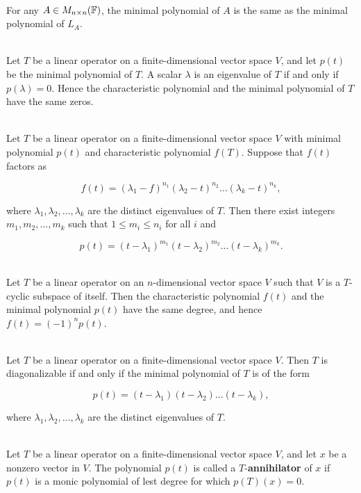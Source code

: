 \begin{corollary}
	\hfill\\
	For any $A \in M_{n \times n}(\mathbb{F})$, the minimal polynomial of $A$ is the same as the minimal polynomial of $L_A$.
\end{corollary}

\begin{theorem}
	\hfill\\
	Let $T$ be a linear operator on a finite-dimensional vector space $V$, and let $p(t)$ be the minimal polynomial of $T$. A scalar $\lambda$ is an eigenvalue of $T$ if and only if $p(\lambda) = 0$. Hence the characteristic polynomial and the minimal polynomial of $T$ have the same zeros.
\end{theorem}

\begin{corollary}
	\hfill\\
	Let $T$ be a linear operator on a finite-dimensional vector space $V$ with minimal polynomial $p(t)$ and characteristic polynomial $f(T)$. Suppose that $f(t)$ factors as

	\[f(t) = (\lambda_1 - f)^{n_1}(\lambda_2 - t)^{n_2} \dots(\lambda_k - t)^{n_k},\]

	where $\lambda_1, \lambda_2, \dots, \lambda_k$ are the distinct eigenvalues of $T$. Then there exist integers $m_1, m_2, \dots, m_k$ such that $1 \leq m_i \leq n_i$ for all $i$ and

	\[p(t) = (t - \lambda_1)^{m_1}(t - \lambda_2)^{m_2}\dots(t - \lambda_k)^{m_k}.\]
\end{corollary}

\begin{theorem}\label{Theorem 7.15}
	\hfill\\
	Let $T$ be a linear operator on an $n$-dimensional vector space $V$ such that $V$ is a $T$-cyclic subspace of itself. Then the characteristic polynomial $f(t)$ and the minimal polynomial $p(t)$ have the same degree, and hence $f(t) = (-1)^np(t)$.
\end{theorem}

\begin{theorem}
	\hfill\\
	Let $T$ be a linear operator on a finite-dimensional vector space $V$. Then $T$ is diagonalizable if and only if the minimal polynomial of $T$ is of the form

	\[p(t) = (t - \lambda_1)(t - \lambda_2) \dots (t - \lambda_k),\]

	where $\lambda_1, \lambda_2, \dots, \lambda_k$ are the distinct eigenvalues of $T$.
\end{theorem}

\begin{definition}
	\hfill\\
	Let $T$ be a linear operator on a finite-dimensional vector space $V$, and let $x$ be a nonzero vector in $V$. The polynomial $p(t)$ is called a $T$-\textbf{annihilator} of $x$ if $p(t)$ is a monic polynomial of lest degree for which $p(T)(x) = 0$.
\end{definition}
